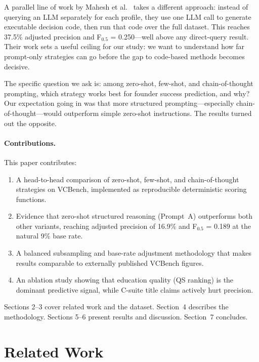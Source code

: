 \documentclass{article}
\begin{document}
A parallel line of work by Mahesh et al.~\cite{mahesh2026stochastic} takes a different approach: instead of querying an LLM separately for each profile, they use one LLM call to generate executable decision code, then run that code over the full dataset. This reaches 37.5\% adjusted precision and F$_{0.5}$ = 0.250---well above any direct-query result. Their work sets a useful ceiling for our study: we want to understand how far prompt-only strategies can go before the gap to code-based methods becomes decisive.

The specific question we ask is: among zero-shot, few-shot, and chain-of-thought prompting, which strategy works best for founder success prediction, and why? Our expectation going in was that more structured prompting---especially chain-of-thought---would outperform simple zero-shot instructions. The results turned out the opposite.

\paragraph{Contributions.} This paper contributes:
\begin{enumerate}
  \item A head-to-head comparison of zero-shot, few-shot, and chain-of-thought strategies on VCBench, implemented as reproducible deterministic scoring functions.
  \item Evidence that zero-shot structured reasoning (Prompt~A) outperforms both other variants, reaching adjusted precision of 16.9\% and F$_{0.5}$ = 0.189 at the natural 9\% base rate.
  \item A balanced subsampling and base-rate adjustment methodology that makes results comparable to externally published VCBench figures.
  \item An ablation study showing that education quality (QS ranking) is the dominant predictive signal, while C-suite title claims actively hurt precision.
\end{enumerate}

Sections 2--3 cover related work and the dataset. Section~4 describes the methodology. Sections 5--6 present results and discussion. Section~7 concludes.

\section{Related Work}
\end{document}

